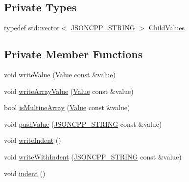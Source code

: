 \subsection*{Private Types}
\begin{DoxyCompactItemize}
\item 
typedef std\+::vector$<$ \hyperlink{json_8h_a1e723f95759de062585bc4a8fd3fa4be_a1e723f95759de062585bc4a8fd3fa4be}{J\+S\+O\+N\+C\+P\+P\+\_\+\+S\+T\+R\+I\+NG} $>$ \hyperlink{structJson_1_1BuiltStyledStreamWriter_a63196b38400e5ce452f65ce856d47b6f_a63196b38400e5ce452f65ce856d47b6f}{Child\+Values}
\end{DoxyCompactItemize}
\subsection*{Private Member Functions}
\begin{DoxyCompactItemize}
\item 
void \hyperlink{structJson_1_1BuiltStyledStreamWriter_a7c9da861861e570a51b45f270c9ff150_a7c9da861861e570a51b45f270c9ff150}{write\+Value} (\hyperlink{classJson_1_1Value}{Value} const \&value)
\item 
void \hyperlink{structJson_1_1BuiltStyledStreamWriter_acd20e9274bbcf7876ef3af2e7d23a31f_acd20e9274bbcf7876ef3af2e7d23a31f}{write\+Array\+Value} (\hyperlink{classJson_1_1Value}{Value} const \&value)
\item 
bool \hyperlink{structJson_1_1BuiltStyledStreamWriter_af423fd33b3d580506ea3efc53b05a077_af423fd33b3d580506ea3efc53b05a077}{is\+Multine\+Array} (\hyperlink{classJson_1_1Value}{Value} const \&value)
\item 
void \hyperlink{structJson_1_1BuiltStyledStreamWriter_a91e8535508412eea04d77c0cafdf15aa_a91e8535508412eea04d77c0cafdf15aa}{push\+Value} (\hyperlink{json_8h_a1e723f95759de062585bc4a8fd3fa4be_a1e723f95759de062585bc4a8fd3fa4be}{J\+S\+O\+N\+C\+P\+P\+\_\+\+S\+T\+R\+I\+NG} const \&value)
\item 
void \hyperlink{structJson_1_1BuiltStyledStreamWriter_a2b38a3714d415c4bd3b4812897130f3d_a2b38a3714d415c4bd3b4812897130f3d}{write\+Indent} ()
\item 
void \hyperlink{structJson_1_1BuiltStyledStreamWriter_a6e80e1a0d5f64df2ec48c3c3b1284990_a6e80e1a0d5f64df2ec48c3c3b1284990}{write\+With\+Indent} (\hyperlink{json_8h_a1e723f95759de062585bc4a8fd3fa4be_a1e723f95759de062585bc4a8fd3fa4be}{J\+S\+O\+N\+C\+P\+P\+\_\+\+S\+T\+R\+I\+NG} const \&value)
\item 
void \hyperlink{structJson_1_1BuiltStyledStreamWriter_a73e09692a2cfbd6e67836b060dc34a9f_a73e09692a2cfbd6e67836b060dc34a9f}{indent} ()

\end{DoxyCompactItemize}
